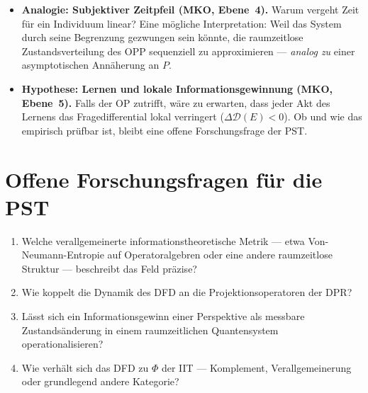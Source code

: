 \documentclass[11pt,a4paper]{article}
\theoremstyle{plain}
\theoremstyle{definition}
\begin{document}
\begin{itemize}
  \item \textbf{Analogie: Subjektiver Zeitpfeil (MKO, Ebene~4).} Warum vergeht Zeit
        f\"{u}r ein Individuum linear? Eine m\"{o}gliche Interpretation: Weil das System
        durch seine Begrenzung gezwungen sein k\"{o}nnte, die raumzeitlose
        Zustandsverteilung des OPP sequenziell zu approximieren --- \emph{analog zu}
        einer asymptotischen Ann\"{a}herung an $P$.

  \item \textbf{Hypothese: Lernen und lokale Informationsgewinnung (MKO, Ebene~5).}
        Falls der OP zutrifft, w\"{a}re zu erwarten, dass jeder Akt des Lernens das
        Fragedifferential lokal verringert ($\Delta \mathcal{D}(E) < 0$). Ob und wie
        das empirisch pr\"{u}fbar ist, bleibt eine offene Forschungsfrage der PST.
\end{itemize}

\section{Offene Forschungsfragen f\"{u}r die PST}

\begin{enumerate}
  \item Welche verallgemeinerte informationstheoretische Metrik --- etwa
        Von-Neumann-Entropie auf Operatoralgebren oder eine andere raumzeitlose Struktur
        --- beschreibt das Feld pr\"{a}zise?
  \item Wie koppelt die Dynamik des DFD an die Projektionsoperatoren der DPR?
  \item L\"{a}sst sich ein Informationsgewinn einer Perspektive als messbare
        Zustands\"{a}nderung in einem raumzeitlichen Quantensystem operationalisieren?
  \item Wie verh\"{a}lt sich das DFD zu $\Phi$ der IIT --- Komplement, Verallgemeinerung
        oder grundlegend andere Kategorie?
\end{enumerate}
\end{document}
